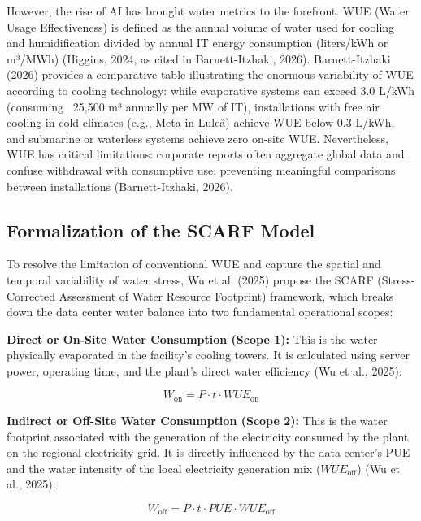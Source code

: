 \documentclass[conference]{IEEEtran}
\begin{document}
However, the rise of AI has brought water metrics to the forefront. WUE (Water Usage Effectiveness) is defined as the annual volume of water used for cooling and humidification divided by annual IT energy consumption (liters/kWh or m³/MWh) (Higgins, 2024, as cited in Barnett-Itzhaki, 2026). Barnett-Itzhaki (2026) provides a comparative table illustrating the enormous variability of WUE according to cooling technology: while evaporative systems can exceed 3.0 L/kWh (consuming ~25,500 m³ annually per MW of IT), installations with free air cooling in cold climates (e.g., Meta in Luleå) achieve WUE below 0.3 L/kWh, and submarine or waterless systems achieve zero on-site WUE. Nevertheless, WUE has critical limitations: corporate reports often aggregate global data and confuse withdrawal with consumptive use, preventing meaningful comparisons between installations (Barnett-Itzhaki, 2026).

\subsection{Formalization of the SCARF Model}

To resolve the limitation of conventional WUE and capture the spatial and temporal variability of water stress, Wu et al. (2025) propose the SCARF (Stress-Corrected Assessment of Water Resource Footprint) framework, which breaks down the data center water balance into two fundamental operational scopes:

\textbf{Direct or On-Site Water Consumption (Scope 1):} This is the water physically evaporated in the facility's cooling towers. It is calculated using server power, operating time, and the plant's direct water efficiency (Wu et al., 2025):

\begin{equation}
W_{\text{on}} = P \cdot t \cdot WUE_{\text{on}}
\end{equation}

\textbf{Indirect or Off-Site Water Consumption (Scope 2):} This is the water footprint associated with the generation of the electricity consumed by the plant on the regional electricity grid. It is directly influenced by the data center's PUE and the water intensity of the local electricity generation mix ($WUE_{\text{off}}$) (Wu et al., 2025):

\begin{equation}
W_{\text{off}} = P \cdot t \cdot PUE \cdot WUE_{\text{off}}
\end{equation}
\end{document}
